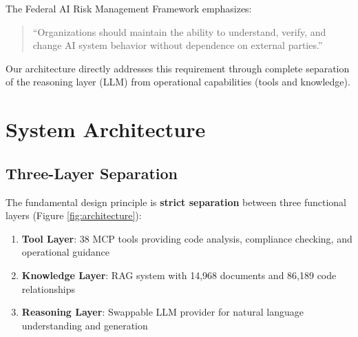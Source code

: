\documentclass[11pt,twocolumn]{article}
\begin{document}
The Federal AI Risk Management Framework \cite{nist2023} emphasizes:

\begin{quote}
    ``Organizations should maintain the ability to understand, verify, and change AI system behavior without dependence on external parties.''
\end{quote}

Our architecture directly addresses this requirement through complete separation of the reasoning layer (LLM) from operational capabilities (tools and knowledge).

\section{System Architecture}

\subsection{Three-Layer Separation}

The fundamental design principle is \textbf{strict separation} between three functional layers (Figure \ref{fig:architecture}):

\begin{enumerate}
    \item \textbf{Tool Layer}: 38 MCP tools providing code analysis, compliance checking, and operational guidance
    \item \textbf{Knowledge Layer}: RAG system with 14,968 documents and 86,189 code relationships
    \item \textbf{Reasoning Layer}: Swappable LLM provider for natural language understanding and generation
\end{enumerate}
\end{document}

